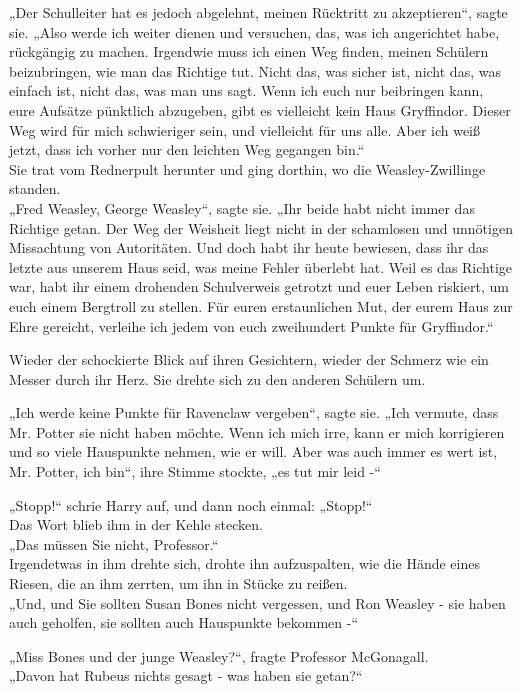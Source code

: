 {„Der Schulleiter hat es jedoch abgelehnt, meinen Rücktritt zu akzeptieren“, sagte sie. „Also werde ich weiter dienen und versuchen, das, was ich angerichtet habe, rückgängig zu machen. Irgendwie muss ich einen Weg finden, meinen Schülern beizubringen, wie man das Richtige tut. Nicht das, was sicher ist, nicht das, was einfach ist, nicht das, was man uns sagt. Wenn ich euch nur beibringen kann, eure Aufsätze pünktlich abzugeben, gibt es vielleicht kein Haus Gryffindor. Dieser Weg wird für mich schwieriger sein, und vielleicht für uns alle. Aber ich weiß jetzt, dass ich vorher nur den leichten Weg gegangen bin.“\\ Sie trat vom Rednerpult herunter und ging dorthin, wo die Weasley-Zwillinge standen.\\ „Fred Weasley, George Weasley“, sagte sie. „Ihr beide habt nicht immer das Richtige getan. Der Weg der Weisheit liegt nicht in der schamlosen und unnötigen Missachtung von Autoritäten. Und doch habt ihr heute bewiesen, dass ihr das letzte aus unserem Haus seid, was meine Fehler überlebt hat. Weil es das Richtige war, habt ihr einem drohenden Schulverweis getrotzt und euer Leben riskiert, um euch einem Bergtroll zu stellen. Für euren erstaunlichen Mut, der eurem Haus zur Ehre gereicht, verleihe ich jedem von euch zweihundert Punkte für Gryffindor.“

Wieder der schockierte Blick auf ihren Gesichtern, wieder der Schmerz wie ein Messer durch ihr Herz. Sie drehte sich zu den anderen Schülern um.

„Ich werde keine Punkte für Ravenclaw vergeben“, sagte sie. „Ich vermute, dass Mr. Potter sie nicht haben möchte. Wenn ich mich irre, kann er mich korrigieren und so viele Hauspunkte nehmen, wie er will. Aber was auch immer es wert ist, Mr. Potter, ich bin“, ihre Stimme stockte, „es tut mir leid -“

„Stopp!“ schrie Harry auf, und dann noch einmal: „Stopp!“\\ Das Wort blieb ihm in der Kehle stecken.\\ „Das müssen Sie nicht, Professor.“\\ Irgendetwas in ihm drehte sich, drohte ihn aufzuspalten, wie die Hände eines Riesen, die an ihm zerrten, um ihn in Stücke zu reißen.\\ „Und, und Sie sollten Susan Bones nicht vergessen, und Ron Weasley - sie haben auch geholfen, sie sollten auch Hauspunkte bekommen -“

„Miss Bones und der junge Weasley?“, fragte Professor McGonagall.\\ „Davon hat Rubeus nichts gesagt - was haben sie getan?“

}
